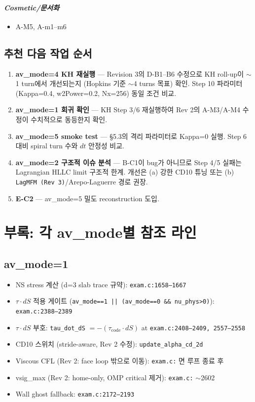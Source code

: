 \documentclass[11pt]{article}
\begin{document}
\paragraph{\textit{Cosmetic/문서화}}
\begin{itemize}
  \item A-M5, A-m1--m6
\end{itemize}

\subsection{추천 다음 작업 순서}
\begin{enumerate}
  \item \textbf{av\_mode=4 KH 재실행} — Revision 3의 D-B1--B6 수정으로 KH roll-up이
        $\sim$1 turn에서 개선되는지 (Hopkins 기준 $\sim$4 turns 목표) 확인.
        Step 10 파라미터 (Kappa=0.4, w2Power=0.2, Nx=256) 동일 조건 비교.
  \item \textbf{av\_mode=1 회귀 확인} — KH Step 3/6 재실행하여 Rev 2의 A-M3/A-M4
        수정이 수치적으로 동등한지 확인.
  \item \textbf{av\_mode=5 smoke test} — §5.3의 격리 파라미터로 Kappa=0 실행.
        Step 6 대비 spiral turn 수와 $dt$ 안정성 비교.
  \item \textbf{av\_mode=2 구조적 이슈 분석} — B-C1이 bug가 아니므로 Step 4/5
        실패는 Lagrangian HLLC limit 구조적 한계. 개선은 (a) 강한 CD10 튜닝
        또는 (b) \texttt{LagMFM (Rev 3)}/Arepo-Laguerre 경로 권장.
  \item \textbf{E-C2} — av\_mode=5 밀도 reconstruction 도입.
\end{enumerate}


\section{부록: 각 av\_mode별 참조 라인}

\subsection*{av\_mode=1}
\begin{itemize}
  \item NS stress 계산 (d=3 slab trace 규약): \texttt{exam.c:1658--1667}
  \item $\tau\cdot dS$ 적용 게이트 (\texttt{av\_mode==1 || (av\_mode==0 \&\& nu\_phys>0)}):
        \texttt{exam.c:2388--2389}
  \item $\tau\cdot dS$ 부호: \texttt{tau\_dot\_dS} $ = -(\tau_\mathrm{code}\cdot dS)$ at
        \texttt{exam.c:2408--2409, 2557--2558}
  \item CD10 스위치 (stride-aware, Rev 2 수정): \texttt{update\_alpha\_cd\_2d}
  \item Viscous CFL (Rev 2: face loop 밖으로 이동): \texttt{exam.c:} 면 루프 종료 후
  \item vsig\_max (Rev 2: home-only, OMP critical 제거): \texttt{exam.c:} $\sim$2602
  \item Wall ghost fallback: \texttt{exam.c:2172--2193}
\end{itemize}
\end{document}
